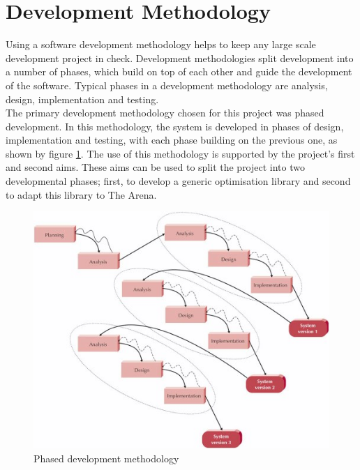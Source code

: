\section{Development Methodology}
Using a software development methodology helps to keep any large scale development project in check. Development methodologies split development into a number of phases, which build on top of each other and guide the development of the software. Typical phases in a development methodology are analysis, design, implementation and testing.
\\The primary development methodology chosen for this project was phased development. In this methodology, the system is developed in phases of design, implementation and testing, with each phase building on the previous one, as shown by figure \ref{fig:phased}\cite{phased}. The use of this methodology is supported by the project's first and second aims. These aims can be used to split the project into two developmental phases; first, to develop a generic optimisation library and second to adapt this library to The Arena.
\begin{figure}[tp]
   \begin{center}
     \includegraphics{Figures/phased}
   \end{center}
   \caption{Phased development methodology}
   \label{fig:phased}
\end{figure}

